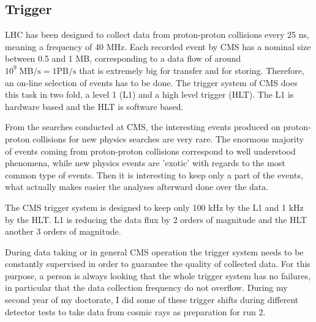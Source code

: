 %
%
%
\subsection{Trigger}
\label{sec:trigger}

LHC has been designed to collect data from proton-proton collisions every 25 ns, meaning a frequency of 40 MHz. Each recorded event by CMS has a nominal size between 0.5 and 1 MB, corresponding to a data flow of around $10^{9}\; \text{MB/s}= 1\text{PB/s}$ that is extremely big for transfer and for storing. Therefore, an on-line selection of events has to be done. The trigger system of CMS does this task in two fold, a level 1 (L1) and a high level trigger (HLT). The L1 is hardware based and the HLT is software based. 

From the searches conducted at CMS, the interesting events produced on proton-proton collisions for new physics searches are very rare. The enormous majority of events coming from proton-proton collisions correspond to well understood phenomena, while new physics events are 'exotic' with regards to the most common type of events. Then it is interesting to keep only a part of the events, what actually makes easier the analyses afterward done over the data. 

The CMS trigger system is designed to keep only 100 kHz by the L1 and 1 kHz by the HLT. L1 is reducing the data flux by 2 orders of magnitude and the HLT another 3 orders of magnitude.

During data taking or in general CMS operation the trigger system needs to be constantly supervised in order to guarantee the quality of collected data. For this purpose, a person is always looking that the whole trigger system has no failures, in particular that the data collection frequency do not overflow. During my second year of my doctorate, I did some of these trigger shifts during different detector tests to take data from cosmic rays as preparation for run 2. %


